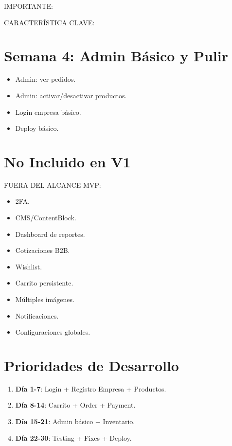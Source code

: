 \documentclass[12pt,a4paper,oneside]{book}
\begin{document}
\begin{alert}{IMPORTANTE:}
\begin{info}{CARACTERÍSTICA CLAVE:}
\section{Semana 4: Admin Básico y Pulir}
\begin{itemize}
    \item[ ] Admin: ver pedidos.
    \item[ ] Admin: activar/desactivar productos.
    \item[ ] Login empresa básico.
    \item[ ] Deploy básico.
\end{itemize}

\section{No Incluido en V1}
\begin{alert}{FUERA DEL ALCANCE MVP:}
\begin{itemize}
    \item 2FA.
    \item CMS/ContentBlock.
    \item Dashboard de reportes.
    \item Cotizaciones B2B.
    \item Wishlist.
    \item Carrito persistente.
    \item Múltiples imágenes.
    \item Notificaciones.
    \item Configuraciones globales.
\end{itemize}
\end{alert}

\section{Prioridades de Desarrollo}
\begin{enumerate}
    \item \textbf{Día 1-7}: Login + Registro Empresa + Productos.
    \item \textbf{Día 8-14}: Carrito + Order + Payment.
    \item \textbf{Día 15-21}: Admin básico + Inventario.
    \item \textbf{Día 22-30}: Testing + Fixes + Deploy.
\end{enumerate}

\appendix

\end{info}
\end{alert}
\end{document}
